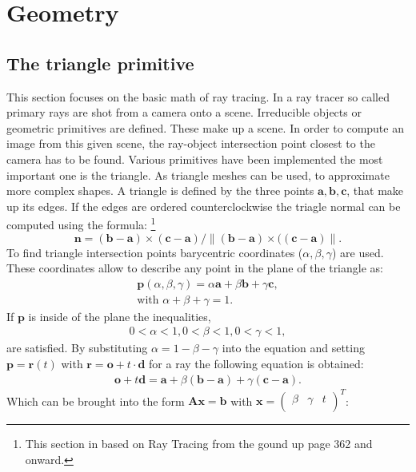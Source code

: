 \section{Geometry}
\subsection{The triangle primitive}
This section focuses on the basic math of ray tracing. In a ray tracer so called primary rays are shot from a camera
onto a scene. Irreducible objects or geometric primitives are defined. These make up a scene. In order to compute an
image from this given scene, the ray-object intersection point closest to the camera has to be found. 
Various primitives have been implemented the most important one is the triangle. As triangle meshes can be used, to
approximate more complex shapes. A triangle is defined by the three points $\mathbf{a},\mathbf{b},\mathbf{c}$, that make up its edges. If the edges are ordered counterclockwise the triagle normal can be computed using the formula:
\footnote{This section in based on Ray Tracing from the gound up page 362 and onward.}
\begin{equation}
\mathbf{n} = (\mathbf{b} - \mathbf{a}) \times (\mathbf{c} - \mathbf{a}) /
 \|( \mathbf{b} - \mathbf{a} ) \times ((\mathbf{c} - \mathbf{a})\|.
\label{eq:triNormal}
\end{equation}
To find triangle intersection points barycentric coordinates ($\alpha, \beta, \gamma$) are used. These coordinates allow to describe any point in the plane of the triangle as:
\begin{align}
\mathbf{p}(\alpha,\beta,\gamma) = \alpha \mathbf{a} + \beta \mathbf{b} + \gamma \mathbf{c}, \\
\text{with } \alpha + \beta + \gamma = 1.
\end{align}
If $\mathbf{p}$ is inside of the plane the inequalities,
\begin{align}
0 < \alpha < 1,
0 < \beta < 1,
0 < \gamma < 1,
\label{ineq:inCond}
\end{align}
are satisfied. By substituting $\alpha = 1 - \beta - \gamma$ into the equation and setting $\mathbf{p} = \mathbf{r}(t)$ with $\mathbf{r} = \mathbf{o} + t \cdot \mathbf{d}$ for a ray the following equation is obtained:
\begin{align}
\mathbf{o} + t\mathbf{d} = \mathbf{a} + \beta(\mathbf{b} - \mathbf{a}) + \gamma (\mathbf{c} - \mathbf{a}).
\end{align}
Which can be brought into the form $\mathbf{A}\mathbf{x} = \mathbf{b}$ with $\mathbf{x} = \begin{pmatrix}
\beta & \gamma & t \\
\end{pmatrix}^T$:
